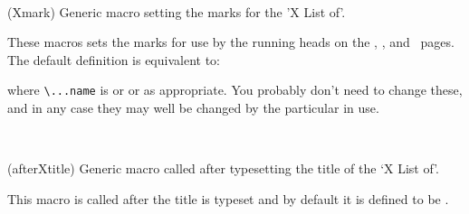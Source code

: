 \begin{syntax}
\cmd{\Xmark} \\
\end{syntax}
\glossary(Xmark)%
  {}%
  {Generic macro setting the marks for the 'X List of'.}
\begin{comment}
\glossary(tocmark)%
  {\cs{tocmark}}%
  {Macro setting the marks for the \prtoc.}
\glossary(lofmark)%
  {\cs{lofmark}}%
  {Macro setting the marks for the \prlof.}
\glossary(lotmark)%
  {\cs{lotmark}}%
  {Macro setting the marks for the \prlot.}
\end{comment}
 These macros sets the marks for use by the running heads on the \toc, \lof, and
 \lot\ pages. The default definition is equivalent to:
\begin{lcode}
\newcommand{\Xmark}{\markboth{\...name}{\...name}}
\end{lcode}
where \verb?\...name? is \cmd{\contentsname} or \cmd{\listfigurename} or
\cmd{\listtablename} as appropriate. You probably don't need to change these, and
in any case they may well be changed by the particular \cmd{\pagestyle} in
use.

\begin{syntax}
\cmd{\afterXtitle} \\
\end{syntax}
\glossary(afterXtitle)%
  {}%
  {Generic macro called after typesetting the title of the `X List of'.}
\begin{comment}
\glossary(aftertoctitle)%
  {\cs{aftertoctitle}}%
  {Macro called after typesetting the title of the \prtoc.}
\glossary(afterloftitle)%
  {\cs{afterloftitle}}%
  {Macro called after typesetting the title of the \prlof.}
\glossary(afterlottitle)%
  {\cs{afterlottitle}}%
  {Macro called after typesetting the title of the \prlot.}
\end{comment}
 This macro is called after the title is typeset and by
default it is defined to be \cmd{\afterchaptertitle}.

